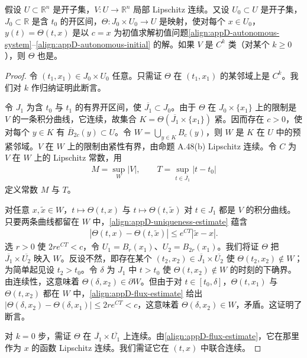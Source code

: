 \documentclass[../../main.tex]{subfiles}
\begin{document}
\begin{theorem}\label{theorem:appD-smoothness}
假设 $U\subset\mathbb R^n$ 是开子集，$V:U\to\mathbb R^n$ 局部 Lipschitz 连续。又设 $U_0\subset U$ 是开子集，$J_0\subset\mathbb R$ 是含 $t_0$ 的开区间，$\Theta:J_0\times U_0\to U$ 是映射，使对每个 $x\in U_0$，$y(t)=\Theta(t,x)$ 是以 $c=x$ 为初值求解初值问题\eqref{align:appD-autonomous-system}--\eqref{align:appD-autonomous-initial} 的解。如果 $V$ 是 $C^k$ 类（对某个 $k\geqslant0$），则 $\Theta$ 也是。
\end{theorem}

\begin{proof}
令 $(t_1,x_1)\in J_0\times U_0$ 任意。只需证 $\Theta$ 在 $(t_1,x_1)$ 的某邻域上是 $C^k$。我们对 $k$ 作归纳证明此断言。

令 $J_1$ 为含 $t_0$ 与 $t_1$ 的有界开区间，使 $\overline{J_1}\subset J_0$。由于 $\Theta$ 在 $J_0\times\{x_1\}$ 上的限制是 $V$ 的一条积分曲线，它连续，故集合 $K=\Theta(\overline{J_1}\times\{x_1\})$ 紧。因而存在 $c>0$，使对每个 $y\in K$ 有 $\overline B_{2c}(y)\subset U$。令 $W=\bigcup_{y\in K}B_c(y)$，则 $W$ 是 $K$ 在 $U$ 中的预紧邻域。$V$ 在 $W$ 上的限制由紧性有界，由命题 A.48(b) Lipschitz 连续。令 $C$ 为 $V$ 在 $W$ 上的 Lipschitz 常数，用
\begin{align*}
M=\sup_W|V|,\qquad T=\sup_{t\in\overline{J_1}}|t-t_0|
\end{align*}
定义常数 $M$ 与 $T$。

对任意 $x,\widetilde x\in W$，$t\mapsto\Theta(t,x)$ 与 $t\mapsto\Theta(t,\widetilde x)$ 对 $t\in J_1$ 都是 $V$ 的积分曲线。只要两条曲线都留在 $W$ 中，\eqref{align:appD-uniqueness-estimate} 蕴含
\begin{align}\label{align:appD-flux-estimate}
|\Theta(t,x)-\Theta(t,\widetilde x)|\leqslant e^{CT}|\widetilde x-x|.
\end{align}
选 $r>0$ 使 $2re^{CT}<c$，令 $U_1=B_r(x_1)$、$U_2=B_{2r}(x_1)$。我们将证 $\Theta$ 把 $\overline{J_1}\times\overline{U_2}$ 映入 $W$。反设不然，即存在某个 $(t_2,x_2)\in\overline{J_1}\times\overline{U_2}$ 使 $\Theta(t_2,x_2)\notin W$；为简单起见设 $t_2>t_0$。令 $\delta$ 为 $J_1$ 中 $t>t_0$ 使 $\Theta(t,x_2)\notin W$ 的时刻的下确界。由连续性，这意味着 $\Theta(\delta,x_2)\in\partial W$。但由于对 $t\in[t_0,\delta]$，$\Theta(t,x_1)$ 与 $\Theta(t,x_2)$ 都在 $W$ 中，\eqref{align:appD-flux-estimate} 给出 $|\Theta(\delta,x_2)-\Theta(\delta,x_1)|\leqslant2re^{CT}<c$，这意味着 $\Theta(\delta,x_2)\in W$，矛盾。这证明了断言。

对 $k=0$ 步，需证 $\Theta$ 在 $\overline{J_1}\times\overline{U_1}$ 上连续。由\eqref{align:appD-flux-estimate}，它在那里作为 $x$ 的函数 Lipschitz 连续。我们需证它在 $(t,x)$ 中联合连续。


\end{proof}
\end{document}
